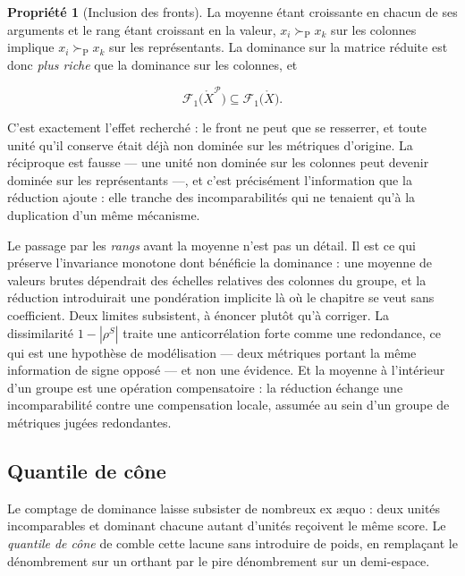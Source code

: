 \documentclass[11pt,a4paper]{article}
\theoremstyle{definition}
\newtheorem{propriete}{Propriété}[section]
\theoremstyle{remark}
\newcommand{\abs}[1]{\left\lvert #1 \right\rvert}
\newcommand{\pareto}{\succ_{\mathrm{P}}}
\newcommand{\Xor}{\mathring{X}}
\begin{document}
\bigskip

\begin{propriete}[Inclusion des fronts]
  \label{prop:inclusion-fronts}
  La moyenne étant croissante en chacun de ses arguments et le rang étant croissant en la
  valeur, $x_i \pareto x_k$ sur les colonnes implique $x_i \pareto x_k$ sur les
  représentants. La dominance sur la matrice réduite est donc \emph{plus riche} que la
  dominance sur les colonnes, et

  \medskip

  \[
    \mathcal{F}_1\big(\Xor^{\mathcal{P}}\big) \subseteq \mathcal{F}_1\big(\Xor\big).
  \]
\end{propriete}

\bigskip

C'est exactement l'effet recherché : le front ne peut que se resserrer, et toute unité
qu'il conserve était déjà non dominée sur les métriques d'origine. La réciproque est
fausse --- une unité non dominée sur les colonnes peut devenir dominée sur les
représentants ---, et c'est précisément l'information que la réduction ajoute : elle
tranche des incomparabilités qui ne tenaient qu'à la duplication d'un même mécanisme.

\bigskip

Le passage par les \emph{rangs} avant la moyenne n'est pas un détail. Il est ce qui
préserve l'invariance monotone dont bénéficie la dominance : une moyenne de valeurs
brutes dépendrait des échelles relatives des colonnes du groupe, et la réduction
introduirait une pondération implicite là où le chapitre se veut sans coefficient. Deux
limites subsistent, à énoncer plutôt qu'à corriger. La dissimilarité $1 - \abs{\rho^S}$
traite une anticorrélation forte comme une redondance, ce qui est une hypothèse de
modélisation --- deux métriques portant la même information de signe opposé --- et non
une évidence. Et la moyenne à l'intérieur d'un groupe est une opération compensatoire :
la réduction échange une incomparabilité contre une compensation locale, assumée au sein
d'un groupe de métriques jugées redondantes.

\bigskip

\subsection{Quantile de cône}
\label{sec:cone}

\medskip

Le comptage de dominance laisse subsister de nombreux ex \ae quo : deux unités
incomparables et dominant chacune autant d'unités reçoivent le même score. Le
\emph{quantile de cône} de \citet{hamel2018} comble cette lacune sans introduire de poids,
en remplaçant le dénombrement sur un orthant par le pire dénombrement sur un demi-espace.
\end{document}
